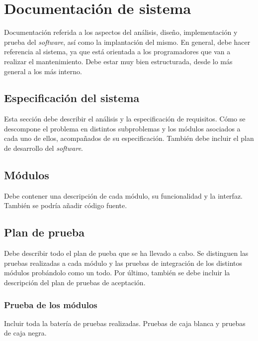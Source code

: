 

\section{Documentación de sistema}

Documentación referida a los aspectos del análisis, diseño, implementación y prueba del \textit{software}, así como la implantación del mismo. En general, debe hacer referencia al sistema, ya que está orientada a los programadores que van a realizar el mantenimiento. Debe estar muy bien estructurada, desde lo más general a los más interno.   


\subsection{Especificación del sistema}

Esta sección debe describir el análisis y la especificación de requisitos. Cómo se descompone el problema en distintos subproblemas y los módulos asociados a cada uno de ellos, acompañados de su especificación. También debe incluir el plan de desarrollo del \textit{software}.  


\subsection{Módulos}

Debe contener una descripción de cada módulo, su funcionalidad y la interfaz. También se podría añadir código fuente.  


\subsection{Plan de prueba}

Debe describir todo el plan de pueba que se ha llevado a cabo. Se distinguen las pruebas realizadas a cada módulo y las pruebas de integración de los distintos módulos probándolo como un todo. Por último, también se debe incluir la descripción del plan de pruebas de aceptación.  


\subsubsection{Prueba de los módulos}

Incluir toda la batería de pruebas realizadas. Pruebas de caja blanca y pruebas de caja negra.  


